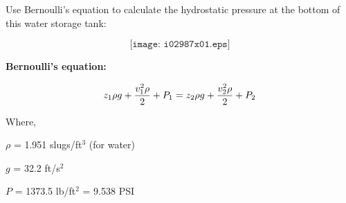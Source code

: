 

Use Bernoulli's equation to calculate the hydrostatic pressure at the bottom of this water storage tank:

$$\texttt{[image: i02987x01.eps]}$$

\noindent
{\bf Bernoulli's equation:}

$$z_1 \rho g + {v_1^2 \rho \over 2} + P_1 = z_2 \rho g + {v_2^2 \rho \over 2} + P_2$$

\vskip 10pt

\noindent
Where,

$\rho$ = 1.951 slugs/ft$^{3}$ (for water)

$g$ = 32.2 ft/s$^{2}$

\vskip 10pt







$P$ = 1373.5 lb/ft$^{2}$ = 9.538 PSI










